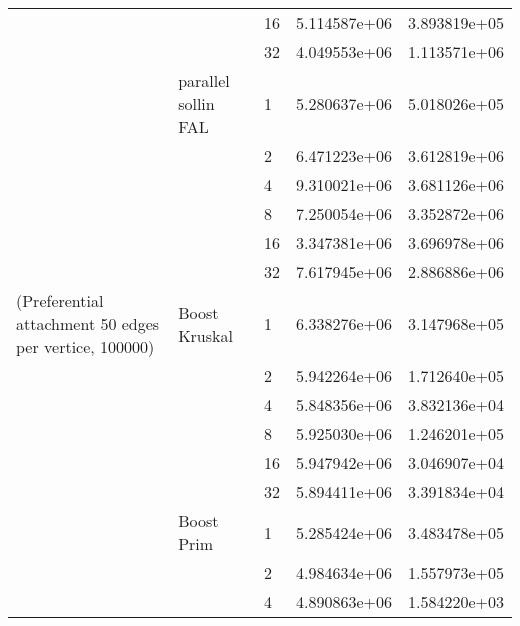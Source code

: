 \begin{tabular}{lllrr}
                                                       &                     & 16 &  5.114587e+06 &  3.893819e+05 \\
                                                       &                     & 32 &  4.049553e+06 &  1.113571e+06 \\
                                                       & parallel sollin FAL & 1  &  5.280637e+06 &  5.018026e+05 \\
                                                       &                     & 2  &  6.471223e+06 &  3.612819e+06 \\
                                                       &                     & 4  &  9.310021e+06 &  3.681126e+06 \\
                                                       &                     & 8  &  7.250054e+06 &  3.352872e+06 \\
                                                       &                     & 16 &  3.347381e+06 &  3.696978e+06 \\
                                                       &                     & 32 &  7.617945e+06 &  2.886886e+06 \\
(Preferential attachment 50 edges per vertice, 100000) & Boost Kruskal & 1  &  6.338276e+06 &  3.147968e+05 \\
                                                       &                     & 2  &  5.942264e+06 &  1.712640e+05 \\
                                                       &                     & 4  &  5.848356e+06 &  3.832136e+04 \\
                                                       &                     & 8  &  5.925030e+06 &  1.246201e+05 \\
                                                       &                     & 16 &  5.947942e+06 &  3.046907e+04 \\
                                                       &                     & 32 &  5.894411e+06 &  3.391834e+04 \\
                                                       & Boost Prim & 1  &  5.285424e+06 &  3.483478e+05 \\
                                                       &                     & 2  &  4.984634e+06 &  1.557973e+05 \\
                                                       &                     & 4  &  4.890863e+06 &  1.584220e+03 \\

\end{tabular}
